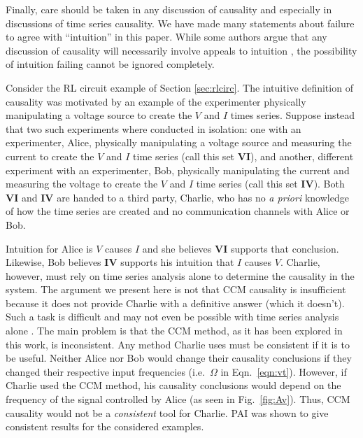 \documentclass[twocolumn,aps,pre,groupedaddress]{revtex4-1}
\begin{document}
Finally, care should be taken in any discussion of causality and especially in discussions of time series causality.  We have made many statements about failure to agree with ``intuition'' in this paper.  While some authors argue that any discussion of causality will necessarily involve appeals to intuition \cite{Pearl2000}, the possibility of intuition failing cannot be ignored completely.  

Consider the RL circuit example of Section \ref{sec:rlcirc}.  The intuitive definition of causality was motivated by an example of the experimenter physically manipulating a voltage source to create the $V$ and $I$ times series.  Suppose instead that two such experiments where conducted in isolation: one with an experimenter, Alice, physically manipulating a voltage source and measuring the current to create the $V$ and $I$ time series (call this set $\mathbf{VI}$), and another, different experiment with an experimenter, Bob, physically manipulating the current and measuring the voltage to create the $V$ and $I$ time series (call this set $\mathbf{IV}$).  Both $\mathbf{VI}$ and $\mathbf{IV}$ are handed to a third party, Charlie, who has no {\em a priori} knowledge of how the time series are created and no communication channels with Alice or Bob.

Intuition for Alice is $V$ causes $I$ and she believes $\mathbf{VI}$ supports that conclusion.  Likewise, Bob believes $\mathbf{IV}$ supports his intuition that $I$ causes $V$.  Charlie, however, must rely on time series analysis alone to determine the causality in the system.  The argument we present here is not that CCM causality is insufficient because it does not provide Charlie with a definitive answer (which it doesn't).  Such a task is difficult and may not even be possible with time series analysis alone \cite{Pearl2000}.  The main problem is that the CCM method, as it has been explored in this work, is inconsistent.  Any method Charlie uses must be consistent if it is to be useful.  Neither Alice nor Bob would change their causality conclusions if they changed their respective input frequencies (i.e.\ $\Omega$ in Eqn.\ \ref{eqn:vt}).  However, if Charlie used the CCM method, his causality conclusions would depend on the frequency of the signal controlled by Alice (as seen in Fig.\ \ref{fig:Av}).  Thus, CCM causality would not be a {\em consistent} tool for Charlie.  PAI was shown to give consistent results for the considered examples.

%

\end{document}

